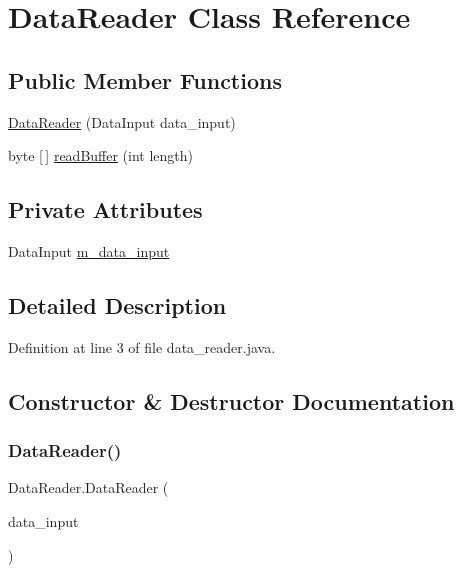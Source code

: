 \hypertarget{class_data_reader}{}\section{Data\+Reader Class Reference}
\label{class_data_reader}
\subsection*{Public Member Functions}
\begin{DoxyCompactItemize}
\item 
\hyperlink{class_data_reader_ab98eb23fccdeea4ba5ff9de51c50b3e9}{Data\+Reader} (Data\+Input data\+\_\+input)
\item 
byte \mbox{[}$\,$\mbox{]} \hyperlink{class_data_reader_acaae40eacf15bd8f1d08d898897efe96}{read\+Buffer} (int length)
\end{DoxyCompactItemize}
\subsection*{Private Attributes}
\begin{DoxyCompactItemize}
\item 
Data\+Input \hyperlink{class_data_reader_aaf3507ee4846ef2793bf4bb568018c25}{m\+\_\+data\+\_\+input}
\end{DoxyCompactItemize}


\subsection{Detailed Description}


Definition at line 3 of file data\+\_\+reader.\+java.



\subsection{Constructor \& Destructor Documentation}
\mbox{\label{class_data_reader_ab98eb23fccdeea4ba5ff9de51c50b3e9}} 
\subsubsection{\texorpdfstring{Data\+Reader()}{DataReader()}}
{\footnotesize\ttfamily Data\+Reader.\+Data\+Reader (\begin{DoxyParamCaption}\item[{Data\+Input}]{data\+\_\+input }\end{DoxyParamCaption})\hspace{0.3cm}{\ttfamily [inline]}}



